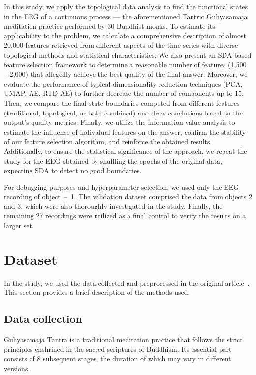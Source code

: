 \documentclass[shortAfour,times,sagev]{sagej}
\begin{document}
In this study, we apply the topological data analysis to find the functional states in the EEG of a continuous process --- the aforementioned Tantric Guhyasamaja meditation practice performed by 30 Buddhist monks. To estimate its applicability to the problem, we calculate a comprehensive description of almost 20,000 features retrieved from different aspects of the time series with diverse topological methods and statistical characteristics. We also present an SDA-based feature selection framework to determine a reasonable number of features (1,500 -- 2,000) that allegedly achieve the best quality of the final answer. Moreover, we evaluate the performance of typical dimensionality reduction techniques (PCA, UMAP, AE, RTD AE) to further decrease the number of components up to 15. Then, we compare the final state boundaries computed from different features (traditional, topological, or both combined) and draw conclusions based on the output's quality metrics. Finally, we utilize the information value analysis to estimate the influence of individual features on the answer, confirm the stability of our feature selection algorithm, and reinforce the obtained results. Additionally, to ensure the statistical significance of the approach, we repeat the study for the EEG obtained by shuffling the epochs of the original data, expecting SDA to detect no good boundaries.

For debugging purposes and hyperparameter selection, we used only the EEG recording of object~\mbox{--}~1. The validation dataset comprised the data from objects 2 and 3, which were also thoroughly investigated in the study. Finally, the remaining 27 recordings were utilized as a final control to verify the results on a larger set. 


\section{Dataset}

In the study, we used the data collected and preprocessed in the original article~\cite{SDA}. This section provides a brief description of the methods used.

\subsection{Data collection}

Guhyasamaja Tantra is a traditional meditation practice that follows the strict principles enshrined in the sacred scriptures of Buddhism. Its essential part consists of 8 subsequent stages, the duration of which may vary in different versions.
\end{document}
